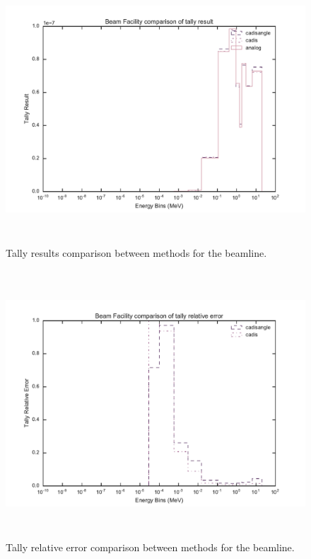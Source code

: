 \begin{figure}[h!]
  \centering
  \includegraphics[height=10cm]{./chapters/characterization_probs/figures/char/beam/beam_facility_tally_result_compare.pdf}
  \caption[Tally results comparison between methods for the beamline.]
  {Tally results comparison between methods for the beamline.}
  \label{fig:beamresult}
\end{figure}

\begin{figure}[h!]
  \centering
  \includegraphics[height=10cm]{./chapters/characterization_probs/figures/char/beam/beam_facility_tally_error_compare.pdf}
  \caption[Tally relative error comparison between methods
    for the beamline.]
  {Tally relative error comparison between methods for the beamline.}
  \label{fig:beamerror}
\end{figure}

